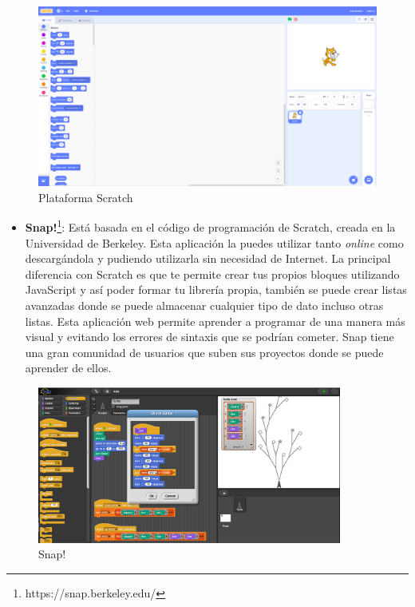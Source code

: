 \begin{figure}[H]
    \centering
    \includegraphics[width=13cm, keepaspectratio]{img/scratch.png}
    \caption{Plataforma Scratch}
    \label{fig:scrach}
\end{figure}
\newpage
\begin{itemize}
\item \textbf{Snap!}\footnote{https://snap.berkeley.edu/}: Está basada en el código de programación de Scratch, creada en la Universidad de Berkeley. Esta aplicación la puedes utilizar tanto \textit{online} como descargándola y pudiendo utilizarla sin necesidad de Internet. La principal diferencia con Scratch es que te permite crear tus propios bloques utilizando JavaScript y así poder formar tu librería propia, también se puede crear listas avanzadas donde se puede almacenar cualquier tipo de dato incluso otras listas.  Esta aplicación web permite aprender a programar de una manera más visual y evitando los errores de sintaxis que se podrían cometer. Snap tiene una gran comunidad de usuarios que suben sus proyectos donde se puede aprender de ellos\cite{app}.
\end{itemize}

\begin{figure}[H]
    \centering
    \includegraphics[width=10cm, keepaspectratio]{img/snap.png}
    \caption{Snap!}
    \label{fig:snap}
\end{figure}

